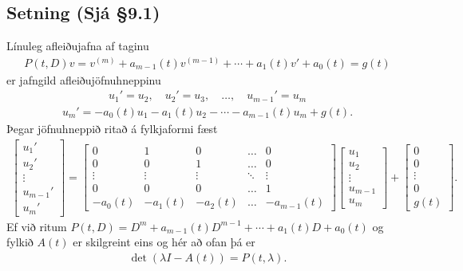 \documentclass[a4paper,10pt,icelandic]{sphinxmanual}
\begin{document}
\subsection{Setning (Sjá \S{}9.1)}
\label{\detokenize{Kafli09:id4}}
Línuleg afleiðujafna af taginu
\begin{equation*}
\begin{split}P(t,D)v= v^{(m)}+a_{m-1}(t)v^{(m-1)}+\cdots+a_1(t)v'
+a_0(t)=g(t)\end{split}
\end{equation*}
er jafngild afleiðujöfnuhneppinu
\begin{equation*}
\begin{split}u_1'=u_2,\quad u_2'=u_3,\quad  \ldots,\quad u_{m-1}'=u_m\end{split}
\end{equation*}\begin{equation*}
\begin{split}u_m' =-a_0(t)u_1-a_1(t)u_2-\cdots-a_{m-1}(t)u_m+g(t).\end{split}
\end{equation*}
Þegar jöfnuhneppið ritað á fylkjaformi fæst
\begin{equation*}
\begin{split}\begin{bmatrix}u_1'\\u_2'\\\vdots\\u_{m-1}'\\u_m'\end{bmatrix}
=\begin{bmatrix}
0&1&0&\dots&0\\
0&0&1&\dots&0\\
\vdots&\vdots&\vdots&\ddots&\vdots\\
0&0&0&\dots&1\\
-a_0(t)&-a_1(t)&-a_2(t)&\dots&-a_{m-1}(t)
\end{bmatrix}\begin{bmatrix}u_1 \\u_2 \\\vdots\\u_{m-1}\\u_m\end{bmatrix}
+\begin{bmatrix}0 \\0 \\\vdots\\0\\g(t)\end{bmatrix}.\end{split}
\end{equation*}
Ef við ritum \(P(t,D)=D^ m+a_{m-1}(t)D^{m-1}+\cdots+a_1(t)D+a_0(t)\) og fylkið \(A(t)\) er skilgreint eins og hér að ofan þá er
\begin{equation*}
\begin{split}\det(\lambda I-A(t))=P(t,\lambda).\end{split}
\end{equation*}
\end{document}
